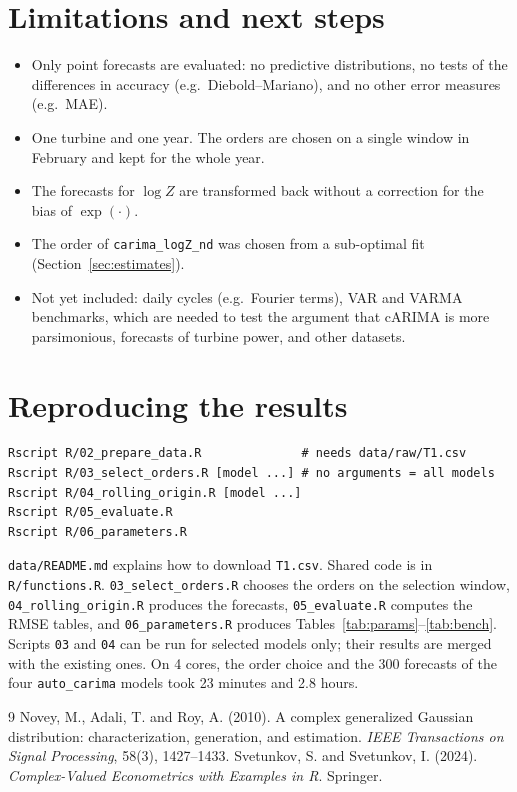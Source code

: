 \documentclass[11pt,a4paper]{article}
\newcommand{\code}[1]{\texttt{#1}}
\begin{document}
\section{Limitations and next steps}

\begin{itemize}
  \item Only point forecasts are evaluated: no predictive distributions, no tests of the
    differences in accuracy (e.g.\ Diebold--Mariano), and no other error measures (e.g.\ MAE).
  \item One turbine and one year. The orders are chosen on a single window in February and kept
    for the whole year.
  \item The forecasts for $\log Z$ are transformed back without a correction for the bias of
    $\exp(\cdot)$.
  \item The order of \code{carima\_logZ\_nd} was chosen from a sub-optimal fit
    (Section~\ref{sec:estimates}).
  \item Not yet included: daily cycles (e.g.\ Fourier terms), VAR and VARMA benchmarks, which are
    needed to test the argument that cARIMA is more parsimonious, forecasts of turbine power, and
    other datasets.
\end{itemize}

\section{Reproducing the results}\label{sec:reproduce}

\begin{verbatim}
Rscript R/02_prepare_data.R              # needs data/raw/T1.csv
Rscript R/03_select_orders.R [model ...] # no arguments = all models
Rscript R/04_rolling_origin.R [model ...]
Rscript R/05_evaluate.R
Rscript R/06_parameters.R
\end{verbatim}

\noindent \code{data/README.md} explains how to download \code{T1.csv}. Shared code is in
\code{R/functions.R}. \code{03\_select\_orders.R} chooses the orders on the selection window,
\code{04\_rolling\_origin.R} produces the forecasts, \code{05\_evaluate.R} computes the RMSE tables,
and \code{06\_parameters.R} produces Tables~\ref{tab:params}--\ref{tab:bench}. Scripts \code{03} and
\code{04} can be run for selected models only; their results are merged with the existing ones. On
4 cores, the order choice and the 300 forecasts of the four \code{auto\_carima} models took 23
minutes and 2.8 hours.

\begin{thebibliography}{9}
Novey, M., Adali, T. and Roy, A. (2010). A complex generalized Gaussian distribution:
characterization, generation, and estimation. \emph{IEEE Transactions on Signal Processing},
58(3), 1427--1433.
Svetunkov, S. and Svetunkov, I. (2024). \emph{Complex-Valued Econometrics with Examples in R}.
Springer.
\end{thebibliography}
\end{document}
